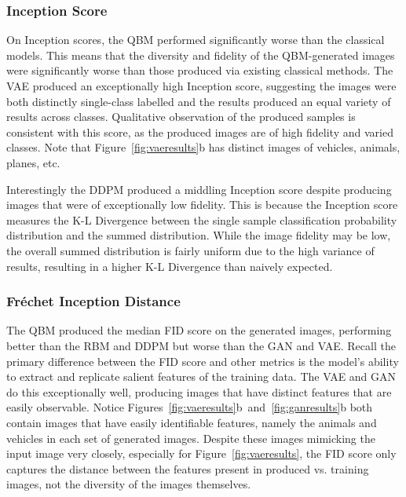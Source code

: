 \documentclass[technologies,article,accept,pdftex,moreauthors]{Definitions/mdpi}
\newcommand{\figref}[1]{Figure~\ref{#1}}
\begin{document}
\subsubsection{Inception Score}
On Inception scores, the QBM performed significantly worse than the classical models. This means that the diversity and fidelity of the QBM-generated images were significantly worse than those produced via existing classical methods. The VAE produced an exceptionally high Inception score, suggesting the images were both distinctly single-class labelled and the results produced an equal variety of results across classes. Qualitative observation of the produced samples is consistent with this score, as the produced images are of high fidelity and varied classes. Note that \figref{fig:vaeresults}b has distinct images of vehicles, animals, planes, etc.


Interestingly the DDPM produced a middling Inception score despite producing images that were of exceptionally low fidelity. This is because the Inception score measures the K-L Divergence between the single sample classification probability distribution and the summed distribution. While the image fidelity may be low, the overall summed distribution is fairly uniform due to the high variance of results, resulting in a higher K-L Divergence than naively expected.

\subsubsection{Fréchet Inception Distance}
The QBM produced the median FID score on the generated images, performing better than the RBM and DDPM but worse than the GAN and VAE. Recall the primary difference between the FID score and other metrics is the model's ability to extract and replicate salient features of the training data. The VAE and GAN do this exceptionally well, producing images that have distinct features that are easily observable. Notice \mbox{Figures~\ref{fig:vaeresults}b and \ref{fig:ganresults}b} both contain images that have easily identifiable features, namely the animals and vehicles in each set of generated images. Despite these images mimicking the input image very closely, especially for \figref{fig:vaeresults}, the FID score only captures the distance between the features present in produced vs. training images, not the diversity of the images themselves.
\end{document}
